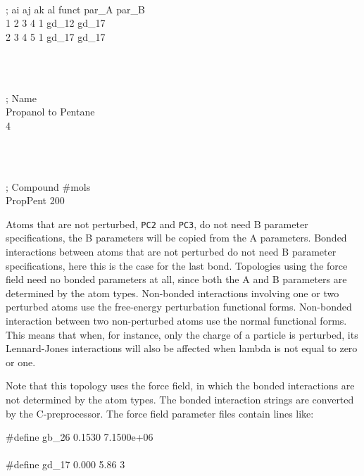 \begin{tt}
[ dihedrals ]\\
;  ai    aj    ak    al funct    par\_A   par\_B\\
    1     2     3     4     1    gd\_12   gd\_17\\
    2     3     4     5     1    gd\_17   gd\_17\\
\end{tt}\\
\begin{tt}
[ system ]\\
; Name\\
Propanol to Pentane\\
4\end{tt}\\
\begin{tt}
[ molecules ]\\
; Compound        \#mols\\
PropPent            200\\
\end{tt}

Atoms that are not perturbed, {\tt PC2} and {\tt PC3}, do not need B parameter
specifications, the B parameters will be copied from the A parameters.
Bonded interactions between atoms that are not perturbed do not need B
parameter specifications, here this is the case for the last bond.
Topologies using the {\gromacs} force field need no bonded parameters at all,
since both the A and B parameters are determined by the atom types.
Non-bonded interactions involving one or two perturbed atoms use the 
free-energy perturbation functional forms.
Non-bonded interaction between two non-perturbed atoms use the normal
functional forms.
This means that when, for instance, only the charge of a particle is
perturbed, its Lennard-Jones interactions will also be affected when
lambda is not equal to zero or one.

Note that this topology uses the  force field, in which the bonded
interactions are not determined by the atom types. The bonded interaction
strings are converted by the C-preprocessor. The force field parameter
files contain lines like:

\begin{tt}
\#define gb\_26       0.1530  7.1500e+06\\
\\
\#define gd\_17     0.000       5.86          3\\
\end{tt}

